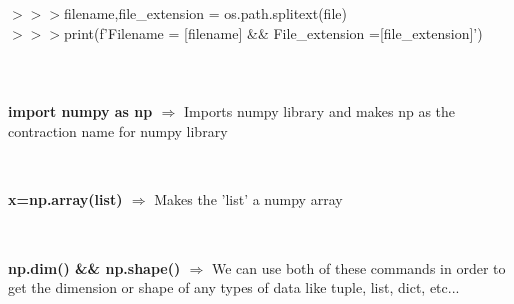 \documentclass[a4paper,18pt]{article}
\begin{document}
$>>>$\hspace*{28pt}filename,file\_extension = os.path.splitext(file)\\

$>>>$\hspace*{28pt}print(f'Filename = {[filename]} \&\& File\_extension ={[file\_extension]}')\\\\


\newpage

\section{\colorbox {Abi}{}}
\subsection{\colorbox {matgreen}{\color{white}{\large import numpy as np}}}
\textbf{import numpy as np $\Rightarrow$} Imports numpy library and makes np as the contraction name for numpy library\\\\


\subsection{\colorbox {matgreen}{\color{white}{\large np.array(list)}}}
\textbf{x=np.array(list) $\Rightarrow$} Makes the 'list' a numpy array\\\\


\subsection{\colorbox {matgreen}{\color{white}{\large Dimension and Shape}}}
\textbf{np.dim() \&\& np.shape() $\Rightarrow$} We can use both of these commands in order to get the dimension or shape of any types of data like tuple, list, dict, etc...\\\\
\end{document}
